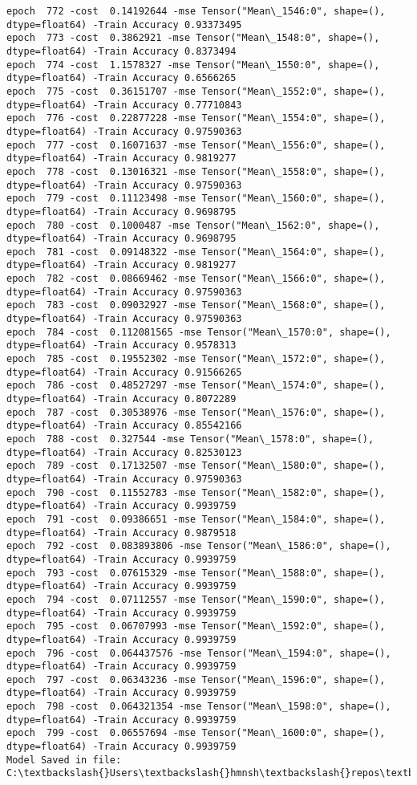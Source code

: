 \documentclass[11pt]{article}
\begin{document}
\begin{Verbatim}[commandchars=\\\{\}]
epoch  772 -cost  0.14192644 -mse Tensor("Mean\_1546:0", shape=(), dtype=float64) -Train Accuracy 0.93373495
epoch  773 -cost  0.3862921 -mse Tensor("Mean\_1548:0", shape=(), dtype=float64) -Train Accuracy 0.8373494
epoch  774 -cost  1.1578327 -mse Tensor("Mean\_1550:0", shape=(), dtype=float64) -Train Accuracy 0.6566265
epoch  775 -cost  0.36151707 -mse Tensor("Mean\_1552:0", shape=(), dtype=float64) -Train Accuracy 0.77710843
epoch  776 -cost  0.22877228 -mse Tensor("Mean\_1554:0", shape=(), dtype=float64) -Train Accuracy 0.97590363
epoch  777 -cost  0.16071637 -mse Tensor("Mean\_1556:0", shape=(), dtype=float64) -Train Accuracy 0.9819277
epoch  778 -cost  0.13016321 -mse Tensor("Mean\_1558:0", shape=(), dtype=float64) -Train Accuracy 0.97590363
epoch  779 -cost  0.11123498 -mse Tensor("Mean\_1560:0", shape=(), dtype=float64) -Train Accuracy 0.9698795
epoch  780 -cost  0.1000487 -mse Tensor("Mean\_1562:0", shape=(), dtype=float64) -Train Accuracy 0.9698795
epoch  781 -cost  0.09148322 -mse Tensor("Mean\_1564:0", shape=(), dtype=float64) -Train Accuracy 0.9819277
epoch  782 -cost  0.08669462 -mse Tensor("Mean\_1566:0", shape=(), dtype=float64) -Train Accuracy 0.97590363
epoch  783 -cost  0.09032927 -mse Tensor("Mean\_1568:0", shape=(), dtype=float64) -Train Accuracy 0.97590363
epoch  784 -cost  0.112081565 -mse Tensor("Mean\_1570:0", shape=(), dtype=float64) -Train Accuracy 0.9578313
epoch  785 -cost  0.19552302 -mse Tensor("Mean\_1572:0", shape=(), dtype=float64) -Train Accuracy 0.91566265
epoch  786 -cost  0.48527297 -mse Tensor("Mean\_1574:0", shape=(), dtype=float64) -Train Accuracy 0.8072289
epoch  787 -cost  0.30538976 -mse Tensor("Mean\_1576:0", shape=(), dtype=float64) -Train Accuracy 0.85542166
epoch  788 -cost  0.327544 -mse Tensor("Mean\_1578:0", shape=(), dtype=float64) -Train Accuracy 0.82530123
epoch  789 -cost  0.17132507 -mse Tensor("Mean\_1580:0", shape=(), dtype=float64) -Train Accuracy 0.97590363
epoch  790 -cost  0.11552783 -mse Tensor("Mean\_1582:0", shape=(), dtype=float64) -Train Accuracy 0.9939759
epoch  791 -cost  0.09386651 -mse Tensor("Mean\_1584:0", shape=(), dtype=float64) -Train Accuracy 0.9879518
epoch  792 -cost  0.083893806 -mse Tensor("Mean\_1586:0", shape=(), dtype=float64) -Train Accuracy 0.9939759
epoch  793 -cost  0.07615329 -mse Tensor("Mean\_1588:0", shape=(), dtype=float64) -Train Accuracy 0.9939759
epoch  794 -cost  0.07112557 -mse Tensor("Mean\_1590:0", shape=(), dtype=float64) -Train Accuracy 0.9939759
epoch  795 -cost  0.06707993 -mse Tensor("Mean\_1592:0", shape=(), dtype=float64) -Train Accuracy 0.9939759
epoch  796 -cost  0.064437576 -mse Tensor("Mean\_1594:0", shape=(), dtype=float64) -Train Accuracy 0.9939759
epoch  797 -cost  0.06343236 -mse Tensor("Mean\_1596:0", shape=(), dtype=float64) -Train Accuracy 0.9939759
epoch  798 -cost  0.064321354 -mse Tensor("Mean\_1598:0", shape=(), dtype=float64) -Train Accuracy 0.9939759
epoch  799 -cost  0.06557694 -mse Tensor("Mean\_1600:0", shape=(), dtype=float64) -Train Accuracy 0.9939759
Model Saved in file: C:\textbackslash{}Users\textbackslash{}hmnsh\textbackslash{}repos\textbackslash{}edureka\textbackslash{}sonar

    \end{Verbatim}
\end{document}
